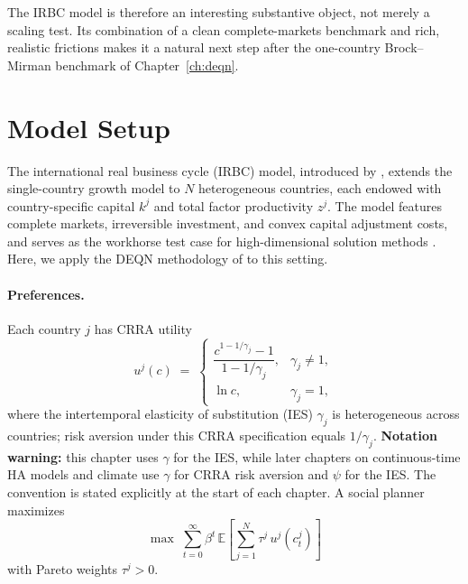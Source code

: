 \documentclass[11pt,a4paper]{report}
\newcommand{\E}[1]{\mathbb{E}\!\left[#1\right]}
\begin{document}
The IRBC model is therefore an interesting substantive object, not merely a scaling test.  Its combination of a clean complete-markets benchmark and rich, realistic frictions makes it a natural next step after the one-country Brock--Mirman benchmark of Chapter~\ref{ch:deqn}.

\section{Model Setup}

The international real business cycle (IRBC) model, introduced by \citet{backus1992international}, extends the single-country growth model to $N$ heterogeneous countries, each endowed with country-specific capital $k^j$ and total factor productivity $z^j$.  The model features complete markets, irreversible investment, and convex capital adjustment costs, and serves as the workhorse test case for high-dimensional solution methods \citep[see, e.g.,][]{ECTA:ECTA1716}.  Here, we apply the DEQN methodology of \citet{azinovicDEEPEQUILIBRIUMNETS2022} to this setting.

\paragraph{Preferences.}  Each country $j$ has CRRA utility
\begin{equation}
u^j(c) \;=\; \begin{cases}
\dfrac{c^{1-1/\gamma_j} - 1}{1 - 1/\gamma_j}, & \gamma_j \neq 1,\\[6pt]
\ln c, & \gamma_j = 1,
\end{cases}
\end{equation}
where the intertemporal elasticity of substitution (IES) $\gamma_j$ is heterogeneous across countries; risk aversion under this CRRA specification equals $1/\gamma_j$.  \textbf{Notation warning:} this chapter uses $\gamma$ for the IES, while later chapters on continuous-time HA models and climate use $\gamma$ for CRRA risk aversion and $\psi$ for the IES.  The convention is stated explicitly at the start of each chapter.  A social planner maximizes
\begin{equation}
\max \; \sum_{t=0}^{\infty} \beta^t \, \E{\sum_{j=1}^{N} \tau^j \, u^j(c_t^j)}
\label{eq:irbc_utility}
\end{equation}
with Pareto weights $\tau^j > 0$.
\end{document}
